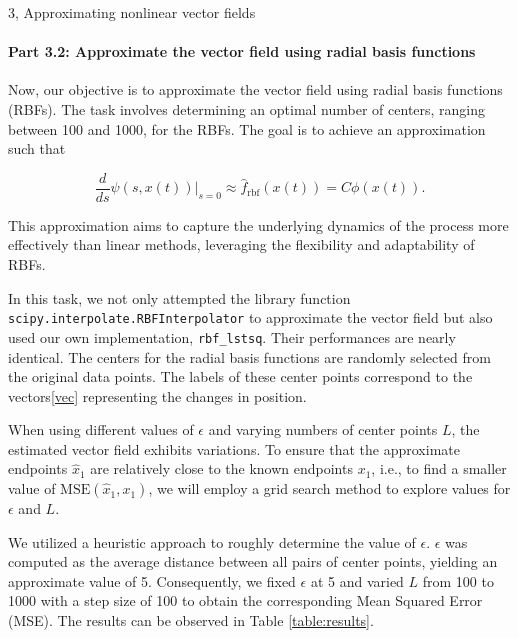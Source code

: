 \begin{task}{3, Approximating nonlinear vector fields}
\paragraph{Part 3.2: Approximate the vector field using radial basis functions}
Now, our objective is to approximate the vector field using radial basis functions (RBFs). The task involves determining an optimal number of centers, ranging between 100 and 1000, for the RBFs. The goal is to achieve an approximation such that 

\[
\frac{d}{ds} \psi(s, x(t)) \bigg|_{s=0} \approx \hat{f}_{\text{rbf}}(x(t)) = C\phi(x(t)).
\]

This approximation aims to capture the underlying dynamics of the process more effectively than linear methods, leveraging the flexibility and adaptability of RBFs.

In this task, we not only attempted the library function \texttt{scipy.interpolate.RBFInterpolator} to approximate the vector field but also used our own implementation, \texttt{rbf\_lstsq}. Their performances are nearly identical. The centers for the radial basis functions are randomly selected from the original data points. The labels of these center points correspond to the vectors\ref{vec} representing the changes in position.

When using different values of \(\epsilon\) and varying numbers of center points \(L\), the estimated vector field exhibits variations. To ensure that the approximate endpoints \(\hat{x}_1\) are relatively close to the known endpoints \(x_1\), i.e., to find a smaller value of \(\text{MSE}(\hat{x}_1, x_1)\), we will employ a grid search method to explore values for \(\epsilon\) and \(L\).

We utilized a heuristic approach to roughly determine the value of \(\epsilon\). \(\epsilon\) was computed as the average distance between all pairs of center points, yielding an approximate value of 5. Consequently, we fixed \(\epsilon\) at 5 and varied \(L\) from 100 to 1000 with a step size of 100 to obtain the corresponding Mean Squared Error (MSE). The results can be observed in Table \ref{table:results}.


\end{task}
